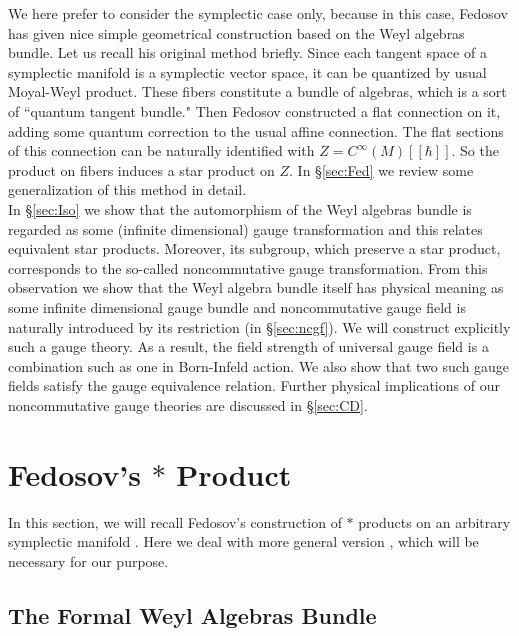 \documentclass[10pt,a4paper]{article}
\def\h{\hbar}
\begin{document}
We here prefer to consider the symplectic case only, because in this case, Fedosov \cite{Fed}\cite{Fedbk} has given nice simple geometrical construction based on the Weyl algebras bundle. Let us recall his original method \cite{Fed} briefly. Since each tangent space of a symplectic manifold is a symplectic vector space, it can be quantized by usual Moyal-Weyl product. These fibers constitute a bundle of algebras, which is a sort of ``quantum tangent bundle." Then Fedosov constructed a flat connection on it, adding some quantum correction to the usual affine connection.  The flat sections of this connection can be naturally identified with $Z=C^\infty(M)[[\h]]$. So the product on fibers induces a star product on $Z$. In \S\ref{sec:Fed} we review some generalization of this method in detail.\\

In \S\ref{sec:Iso} we show that the automorphism of the Weyl algebras bundle is regarded as some (infinite dimensional) gauge transformation and this relates equivalent star products. Moreover, its subgroup, which preserve a star product, corresponds to the so-called noncommutative gauge transformation. From this observation we show that the Weyl algebra bundle itself has physical meaning as some infinite dimensional gauge bundle and noncommutative gauge field is naturally introduced by its restriction (in \S\ref{sec:ncgf}). We will construct explicitly such a gauge theory. As a result, the field strength of universal gauge field is a combination such as one in Born-Infeld action.  We also show that two such gauge fields satisfy the gauge equivalence relation. 
Further physical implications of our noncommutative gauge theories are discussed in \S\ref{sec:CD}.\\


\section{Fedosov's $*$ Product
\label{sec:Fed}}

In this section, we will recall Fedosov's construction of $*$ products on an arbitrary symplectic manifold \cite{Fed}\cite{Fedbk}. Here we deal with more general version \cite{Fedbk}, which will be necessary for our purpose.

\subsection{The Formal Weyl Algebras Bundle
\label{sec:Pre} }
\end{document}
